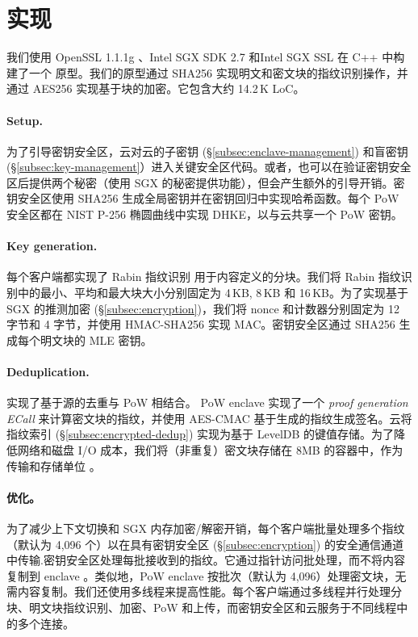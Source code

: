 \section{实现}
\label{sec:implementation}

我们使用 OpenSSL 1.1.1g \cite{openssl}、Intel SGX SDK 2.7 \cite{sgx} 和Intel SGX SSL \cite{sgxssl} 在 C++ 中构建了一个 \sysname 原型。我们的原型通过 SHA256 实现明文和密文块的指纹识别操作，并通过 AES256 实现基于块的加密。它包含大约 14.2\,K LoC。

\paragraph{Setup.} 
为了引导密钥安全区，云对云的子密钥 (\S\ref{subsec:enclave-management}) 和盲密钥 (\S\ref{subsec:key-management}）进入关键安全区代码。或者，\sysname 也可以在验证密钥安全区后提供两个秘密（使用 SGX \cite{sgx} 的秘密提供功能），但会产生额外的引导开销。密钥安全区使用 SHA256 生成全局密钥并在密钥回归中实现哈希函数。每个 PoW 安全区都在 NIST P-256 椭圆曲线中实现 DHKE，以与云共享一个 PoW 密钥。

\paragraph{Key generation.} 每个客户端都实现了 Rabin 指纹识别 \cite{rabin81} 用于内容定义的分块。我们将 Rabin 指纹识别中的最小、平均和最大块大小分别固定为 4\,KB, 8\,KB 和 16\,KB。为了实现基于 SGX 的推测加密 (\S\ref{subsec:encryption})，我们将 nonce 和计数器分别固定为 12 字节和 4 字节，并使用 HMAC-SHA256 实现 MAC。密钥安全区通过 SHA256 生成每个明文块的 MLE 密钥。

\paragraph{Deduplication.} \sysname 实现了基于源的去重与 PoW 相结合。 PoW enclave 实现了一个 \textit{ proof generation ECall} 来计算密文块的指纹，并使用 AES-CMAC 基于生成的指纹生成签名。云将指纹索引 (\S\ref{subsec:encrypted-dedup}) 实现为基于 LevelDB \cite{leveldb} 的键值存储。为了降低网络和磁盘 I/O 成本，我们将（非重复）密文块存储在 8MB 的容器中，作为传输和存储单位 \cite{lillibridge13}。

\paragraph{优化。} 为了减少上下文切换和 SGX 内存加密/解密开销，每个客户端批量处理多个指纹（默认为 4,096 个）以在具有密钥安全区 (\S\ref{subsec:encryption}) 的安全通信通道中传输.密钥安全区处理每批接收到的指纹。它通过指针访问批处理，而不将内容复制到 enclave \cite{harnik18}。类似地，PoW enclave 按批次（默认为 4,096）处理密文块，无需内容复制。我们还使用多线程来提高性能。每个客户端通过多线程并行处理分块、明文块指纹识别、加密、PoW 和上传，而密钥安全区和云服务于不同线程中的多个连接。